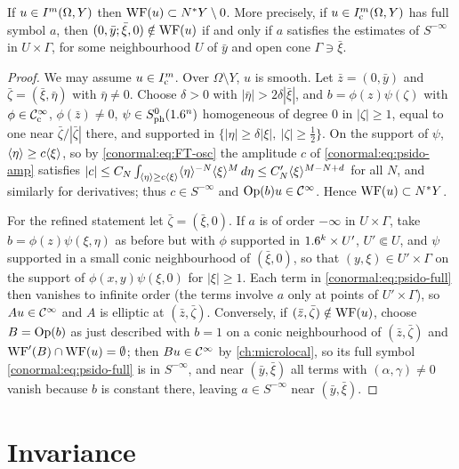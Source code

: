 \begin{proposition}\label{conormal:prop:WF-local}
  If $u\in I^{m}(\Omega,Y)$ then $\operatorname{WF}(u)\subset N^*Y\setminus0$.  More
  precisely, if $u\in I^{m}_{\mathrm c}(\Omega,Y)$ has full symbol $a$, then
  $(0,\bar y;\bar\xi,0)\notin\operatorname{WF}(u)$ if and only if $a$ satisfies the estimates
  of $S^{-\infty}$ in $U\times\Gamma$, for some neighbourhood $U$ of $\bar y$ and
  open cone $\Gamma\ni\bar\xi$.
\end{proposition}
\begin{proof}
  We may assume $u\in I^{m}_{\mathrm c}$.  Over $\Omega\setminus Y$, $u$ is
  smooth.  Let $\bar z=(0,\bar y)$ and $\bar\zeta=(\bar\xi,\bar\eta)$ with
  $\bar\eta\ne0$.  Choose $\delta>0$ with $|\bar\eta|>2\delta|\bar\xi|$, and
  $b=\phi(z)\psi(\zeta)$ with $\phi\in\mathcal{C}^\infty_{\mathrm{c}}$, $\phi(\bar z)\ne0$,
  $\psi\in S^{0}_{\mathrm{ph}}(1.6^n)$ homogeneous of degree $0$ in $|\zeta|\ge1$, equal to
  one near $\bar\zeta/|\bar\zeta|$ there, and supported in
  $\{|\eta|\ge\delta|\xi|,\ |\zeta|\ge\frac12\}$.  On the support of $\psi$,
  $\langle \eta\rangle\ge c\langle \xi\rangle$, so by \eqref{conormal:eq:FT-osc} the amplitude $c$ of
  \eqref{conormal:eq:psido-amp} satisfies
  $|c|\le C_N\int_{\langle \eta\rangle\ge c\langle \xi\rangle}\langle \eta\rangle^{-N}\langle \xi\rangle^{M}\,d\eta\le
  C'_N\langle \xi\rangle^{M-N+d}$ for all $N$, and similarly for derivatives; thus $c\in
  S^{-\infty}$ and $\operatorname{Op}(b)u\in\mathcal{C}^\infty$.  Hence $\operatorname{WF}(u)\subset N^*Y$.

  For the refined statement let $\bar\zeta=(\bar\xi,0)$.  If $a$ is of order
  $-\infty$ in $U\times\Gamma$, take $b=\phi(z)\psi(\xi,\eta)$ as before but
  with $\phi$ supported in $1.6^k\times U'$, $U'\Subset U$, and $\psi$ supported in
  a small conic neighbourhood of $(\bar\xi,0)$, so that $(y,\xi)\in U'\times\Gamma$
  on the support of $\phi(x,y)\psi(\xi,0)$ for $|\xi|\ge1$.  Each term in
  \eqref{conormal:eq:psido-full} then vanishes to infinite order (the terms involve
  $a$ only at points of $U'\times\Gamma$), so $Au\in\mathcal{C}^\infty$ and $A$ is elliptic at
  $(\bar z,\bar\zeta)$.  Conversely, if $(\bar z,\bar\zeta)\notin\operatorname{WF}(u)$, choose
  $B=\operatorname{Op}(b)$ as just described with $b=1$ on a conic neighbourhood of
  $(\bar z,\bar\zeta)$ and $\operatorname{WF}'(B)\cap\operatorname{WF}(u)=\emptyset$; then $Bu\in\mathcal{C}^\infty$ by
  \cref{ch:microlocal}, so its full symbol \eqref{conormal:eq:psido-full} is in
  $S^{-\infty}$, and near $(\bar y,\bar\xi)$ all terms with
  $(\alpha,\gamma)\neq0$ vanish because $b$ is constant there, leaving
  $a\in S^{-\infty}$ near $(\bar y,\bar\xi)$.
\end{proof}

\section{Invariance}\label{conormal:sec:invariance}

